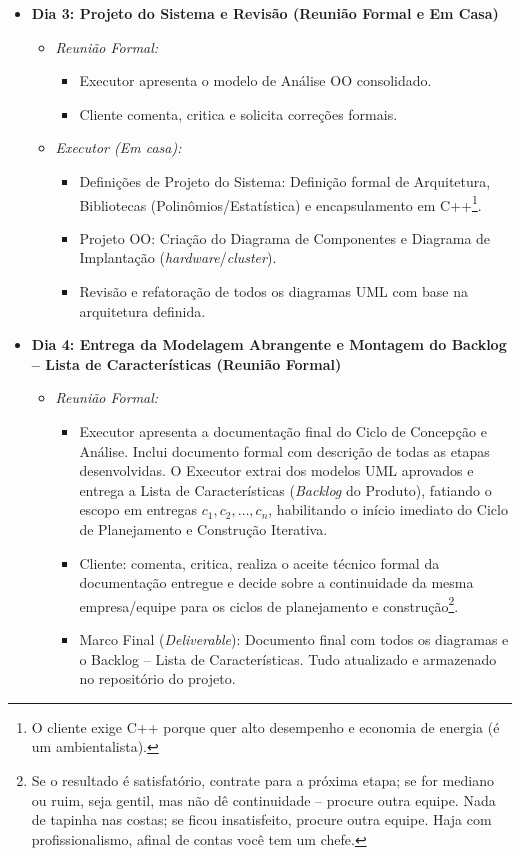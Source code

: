 \documentclass[12pt,a4paper]{article}
\begin{document}
\begin{itemize}[leftmargin=*]
\begin{itemize}
    \item \textbf{Dia 3: Projeto do Sistema e Revisão (Reunião Formal e Em Casa)}
    \begin{itemize}
      \item \textit{Reunião Formal:}
      \begin{itemize}
        \item Executor apresenta o modelo de Análise OO consolidado.
        \item Cliente comenta, critica e solicita correções formais.
      \end{itemize}
      \item \textit{Executor (Em casa):}
      \begin{itemize}
        \item Definições de Projeto do Sistema: Definição formal de Arquitetura, Bibliotecas (Polinômios/Estatística) e encapsulamento em C++\footnote{O cliente exige C++ porque quer alto desempenho e economia de energia (é um ambientalista).}.
        \item Projeto OO: Criação do Diagrama de Componentes e Diagrama de Implantação (\textit{hardware}/\textit{cluster}).
        \item Revisão e refatoração de todos os diagramas UML com base na arquitetura definida.
      \end{itemize}
    \end{itemize}

    \item \textbf{Dia 4: Entrega da Modelagem Abrangente e Montagem do Backlog -- Lista de Características (Reunião Formal)}
    \begin{itemize}
      \item \textit{Reunião Formal:}
      \begin{itemize}
        \item Executor apresenta a documentação final do Ciclo de Concepção e Análise. Inclui documento formal com descrição de todas as etapas desenvolvidas. O Executor extrai dos modelos UML aprovados e entrega a Lista de Características (\textit{Backlog} do Produto), fatiando o escopo em entregas $c_1, c_2, \ldots, c_n$, habilitando o início imediato do Ciclo de Planejamento e Construção Iterativa.
        \item Cliente: comenta, critica, realiza o aceite técnico formal da documentação entregue e decide sobre a continuidade da mesma empresa/equipe para os ciclos de planejamento e construção\footnote{Se o resultado é satisfatório, contrate para a próxima etapa; se for mediano ou ruim, seja gentil, mas não dê continuidade -- procure outra equipe. Nada de tapinha nas costas; se ficou insatisfeito, procure outra equipe. Haja com profissionalismo, afinal de contas você tem um chefe.}.
        \item Marco Final (\textit{Deliverable}): Documento final com todos os diagramas e o Backlog -- Lista de Características. Tudo atualizado e armazenado no repositório do projeto.
      \end{itemize}
    \end{itemize}
  \end{itemize}


\end{itemize}
\end{document}
